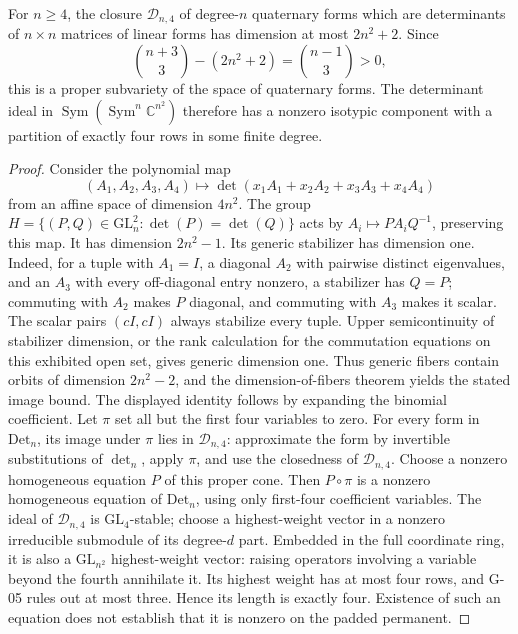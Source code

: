 \begin{proposition}\label{G-06}
For $n\geq4$, the closure $\mathcal D_{n,4}$ of degree-$n$ quaternary forms which are determinants of $n\times n$ matrices of linear forms has dimension at most $2n^2+2$. Since
\[
 \binom{n+3}{3}-(2n^2+2)=\binom{n-1}{3}>0,
\]
this is a proper subvariety of the space of quaternary forms. The determinant ideal in $\operatorname{Sym}(\operatorname{Sym}^n\mathbb C^{n^2})$ therefore has a nonzero isotypic component with a partition of exactly four rows in some finite degree.
\end{proposition}
\begin{proof}
Consider the polynomial map
\[
 (A_1,A_2,A_3,A_4)\longmapsto\det(x_1A_1+x_2A_2+x_3A_3+x_4A_4)
\]
from an affine space of dimension $4n^2$. The group
$H=\{(P,Q)\in\mathrm{GL}_n^2:\det(P)=\det(Q)\}$ acts by $A_i\mapsto PA_iQ^{-1}$, preserving this map. It has dimension $2n^2-1$. Its generic stabilizer has dimension one. Indeed, for a tuple with $A_1=I$, a diagonal $A_2$ with pairwise distinct eigenvalues, and an $A_3$ with every off-diagonal entry nonzero, a stabilizer has $Q=P$; commuting with $A_2$ makes $P$ diagonal, and commuting with $A_3$ makes it scalar. The scalar pairs $(cI,cI)$ always stabilize every tuple. Upper semicontinuity of stabilizer dimension, or the rank calculation for the commutation equations on this exhibited open set, gives generic dimension one. Thus generic fibers contain orbits of dimension $2n^2-2$, and the dimension-of-fibers theorem yields the stated image bound. The displayed identity follows by expanding the binomial coefficient.
Let $\pi$ set all but the first four variables to zero. For every form in $\mathrm{Det}_n$, its image under $\pi$ lies in $\mathcal D_{n,4}$: approximate the form by invertible substitutions of $\det_n$, apply $\pi$, and use the closedness of $\mathcal D_{n,4}$. Choose a nonzero homogeneous equation $P$ of this proper cone. Then $P\circ\pi$ is a nonzero homogeneous equation of $\mathrm{Det}_n$, using only first-four coefficient variables. The ideal of $\mathcal D_{n,4}$ is $\mathrm{GL}_4$-stable; choose a highest-weight vector in a nonzero irreducible submodule of its degree-$d$ part. Embedded in the full coordinate ring, it is also a $\mathrm{GL}_{n^2}$ highest-weight vector: raising operators involving a variable beyond the fourth annihilate it. Its highest weight has at most four rows, and G-05 rules out at most three. Hence its length is exactly four. Existence of such an equation does not establish that it is nonzero on the padded permanent.
\end{proof}

